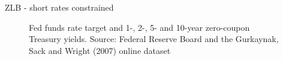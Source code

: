 \begin{frame}{ZLB - short rates constrained}

\begin{figure}
\begin{center}


\end{center}
\caption{Fed funds rate target and 1-, 2-, 5- and 10-year zero-coupon Treasury yields. Source: Federal Reserve Board and the Gurkaynak, Sack and Wright (2007) online dataset}
\end{figure}

\end{frame}


	

